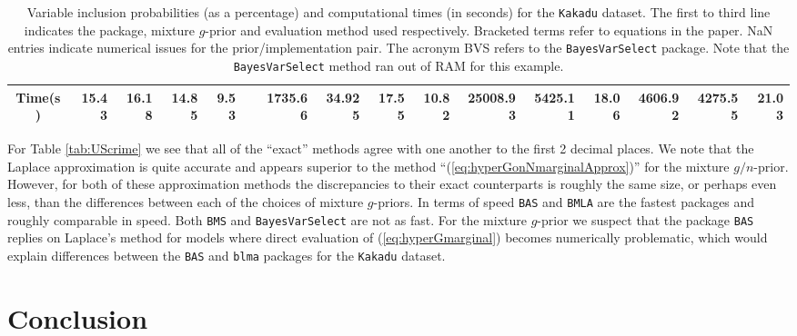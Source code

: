 {\begin{sidewaystable}[h!]
\begin{center}
{\begin{tabular}{c|r|r|rrrrrr|rrrr|rrr}
				Time(s) & 15.43 & 16.18 & 14.85  &  9.53   &       & 1735.66  & 34.925  &   17.55 &  10.82         &  25008.93 & 
				5425.11  &   18.06   & 4606.92       &  4275.55  & 21.03  \\ 
				\hline
			\end{tabular}
		}
	\end{center}
    \caption{Variable inclusion probabilities (as a percentage) and
        computational times (in seconds) for the {\tt Kakadu} dataset.  The
        first to third line indicates the package, mixture $g$-prior and
        evaluation method used respectively. Bracketed terms refer to equations
    in the paper. NaN entries indicate numerical issues for the
prior/implementation pair. The acronym BVS refers to the {\tt BayesVarSelect}
package. Note that the {\tt BayesVarSelect} method ran out of RAM for this
example.}
	\label{tab:Kakadu}
\end{sidewaystable}


For Table \ref{tab:UScrime} we see that all of the ``exact'' methods agree with
one another to the first 2 decimal places. We note that the Laplace
approximation is quite accurate and appears superior to  the method
``(\ref{eq:hyperGonNmarginalApprox})'' for the mixture $g/n$-prior. However,
for both of these approximation methods the discrepancies to their exact
counterparts is roughly the same size, or perhaps even less, than the
differences between each of the choices of mixture $g$-priors. In terms of
speed {\tt BAS} and {\tt BMLA} are the fastest packages and roughly comparable
in speed. Both {\tt BMS} and {\tt BayesVarSelect} are not as fast.  For the
mixture $g$-prior we suspect that the package {\tt BAS} replies on Laplace's
method for models where direct evaluation of (\ref{eq:hyperGmarginal}) becomes
numerically problematic, which would explain differences between the {\tt BAS}
and {\tt blma} packages for the {\tt Kakadu} dataset.

\section{Conclusion}
\label{sec:chapter_3_conclusion}

}
